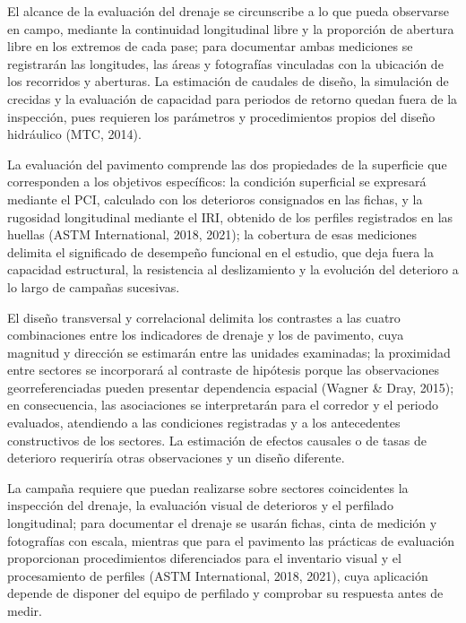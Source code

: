 El alcance de la evaluación del drenaje se circunscribe a lo que pueda observarse en campo, mediante la continuidad longitudinal libre y la proporción de abertura libre en los extremos de cada pase; para documentar ambas mediciones se registrarán las longitudes, las áreas y fotografías vinculadas con la ubicación de los recorridos y aberturas. La estimación de caudales de diseño, la simulación de crecidas y la evaluación de capacidad para periodos de retorno quedan fuera de la inspección, pues requieren los parámetros y procedimientos propios del diseño hidráulico (MTC, 2014).

La evaluación del pavimento comprende las dos propiedades de la superficie que corresponden a los objetivos específicos: la condición superficial se expresará mediante el PCI, calculado con los deterioros consignados en las fichas, y la rugosidad longitudinal mediante el IRI, obtenido de los perfiles registrados en las huellas (ASTM International, 2018, 2021); la cobertura de esas mediciones delimita el significado de desempeño funcional en el estudio, que deja fuera la capacidad estructural, la resistencia al deslizamiento y la evolución del deterioro a lo largo de campañas sucesivas.

El diseño transversal y correlacional delimita los contrastes a las cuatro combinaciones entre los indicadores de drenaje y los de pavimento, cuya magnitud y dirección se estimarán entre las unidades examinadas; la proximidad entre sectores se incorporará al contraste de hipótesis porque las observaciones georreferenciadas pueden presentar dependencia espacial (Wagner \& Dray, 2015); en consecuencia, las asociaciones se interpretarán para el corredor y el periodo evaluados, atendiendo a las condiciones registradas y a los antecedentes constructivos de los sectores. La estimación de efectos causales o de tasas de deterioro requeriría otras observaciones y un diseño diferente.


La campaña requiere que puedan realizarse sobre sectores coincidentes la inspección del drenaje, la evaluación visual de deterioros y el perfilado longitudinal; para documentar el drenaje se usarán fichas, cinta de medición y fotografías con escala, mientras que para el pavimento las prácticas de evaluación proporcionan procedimientos diferenciados para el inventario visual y el procesamiento de perfiles (ASTM International, 2018, 2021), cuya aplicación depende de disponer del equipo de perfilado y comprobar su respuesta antes de medir.

